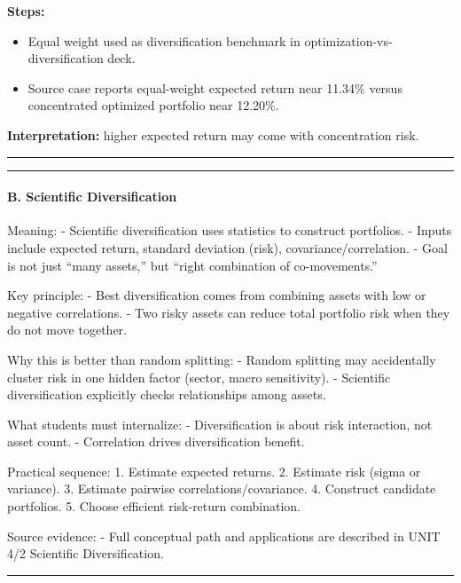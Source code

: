 \documentclass[
]{article}
\begin{document}
\noindent\textbf{Steps:}
\begin{itemize}\setlength{\itemsep}{3pt}
  \item Equal weight used as diversification benchmark in optimization-vs-diversification deck.
  \item Source case reports equal-weight expected return near 11.34\% versus concentrated optimized portfolio near 12.20\%.
\end{itemize}

\noindent\textbf{Interpretation:} higher expected return may come with concentration risk.

\noindent\rule{\linewidth}{0.4pt}
\medskip

\begin{center}\rule{0.5\linewidth}{0.5pt}\end{center}

\hypertarget{b.-scientific-diversification}{%
\paragraph{B. Scientific
Diversification}\label{b.-scientific-diversification}}

Meaning: - Scientific diversification uses statistics to construct
portfolios. - Inputs include expected return, standard deviation (risk),
covariance/correlation. - Goal is not just ``many assets,'' but ``right
combination of co-movements.''

Key principle: - Best diversification comes from combining assets with
low or negative correlations. - Two risky assets can reduce total
portfolio risk when they do not move together.

Why this is better than random splitting: - Random splitting may
accidentally cluster risk in one hidden factor (sector, macro
sensitivity). - Scientific diversification explicitly checks
relationships among assets.

What students must internalize: - Diversification is about risk
interaction, not asset count. - Correlation drives diversification
benefit.

Practical sequence: 1. Estimate expected returns. 2. Estimate risk
(sigma or variance). 3. Estimate pairwise correlations/covariance. 4.
Construct candidate portfolios. 5. Choose efficient risk-return
combination.

Source evidence: - Full conceptual path and applications are described
in UNIT 4/2 Scientific Diversification.

\begin{center}\rule{0.5\linewidth}{0.5pt}\end{center}
\end{document}
